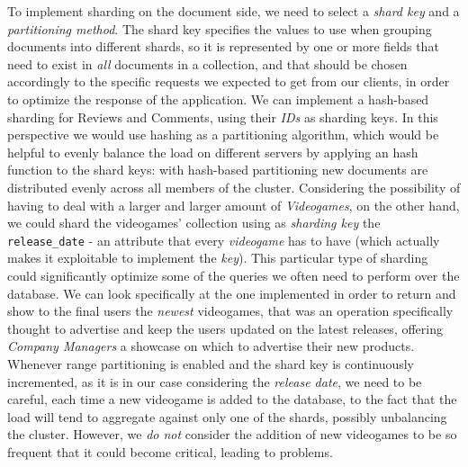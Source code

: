 To implement sharding on the document side, we need to select a \emph{shard key} and a \emph{partitioning method}. The shard key specifies the values to use when grouping documents into different shards, so it is represented by one or more fields that need to exist in \emph{all} documents in a collection, and that should be chosen accordingly to the specific requests we expected to get from our clients, in order to optimize the response of the application. 
We can implement a hash-based sharding for Reviews and Comments, using their \emph{IDs} as sharding keys. In this perspective we would use hashing as a partitioning algorithm, which would be helpful to evenly balance the load on different servers by applying an hash function to the shard keys: with hash-based partitioning
new documents are distributed evenly across all members of the cluster.
Considering the possibility of having to deal with a larger and larger amount of \emph{Videogames}, on the other hand, we could shard the videogames' collection using as \emph{sharding key} the \texttt{release\_date} - an attribute that every \emph{videogame} has to have (which actually makes it exploitable to implement the \emph{key}). This particular type of sharding could significantly optimize some of the queries we often need to perform over the database. We can look specifically at the one implemented in order to return and show to the final users the \emph{newest} videogames, that was an operation specifically thought to advertise and keep the users updated on the latest releases, offering \emph{Company Managers} a showcase on which to advertise their new products. 
Whenever range partitioning is enabled and the shard key is continuously incremented, as it is in our case considering the \emph{release date}, we need to be careful, each time a new videogame is added to the database, to the fact that the load will tend to aggregate against only one of the shards, possibly unbalancing the cluster. However, we \emph{do not} consider the addition of new videogames to be so frequent that it could become critical, leading to problems.

